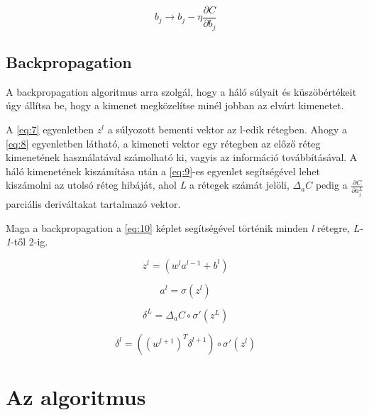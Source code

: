 \begin{equation} \label{eq:5}
\ b_{j} \rightarrow b_{j} - \eta\frac{\partial C}{\partial b_{j}} 
\end{equation}


\section{Backpropagation}\label{sec:INTRO:backprop}


A backpropagation algoritmus arra szolgál, hogy a háló súlyait és küszöbértékeit úgy állítsa be, hogy a kimenet megközelítse minél jobban az elvárt kimenetet.

A \ref{eq:7} egyenletben $z^l$ a súlyozott bementi vektor az l-edik rétegben. Ahogy a \ref{eq:8} egyenletben látható, a kimeneti vektor egy rétegben az előző réteg kimenetének használatával számolható ki, vagyis az információ továbbításával. A háló kimenetének kiszámítása után a \ref{eq:9}-es egyenlet segítségével lehet kiszámolni az utolsó réteg hibáját, ahol \textit{L} a rétegek számát jelöli, \textit{$\Delta_aC$} pedig a $\frac{\partial C}{\partial a_j^L}$ parciális deriváltakat tartalmazó vektor.


Maga a backpropagation a \ref{eq:10} képlet segítségével történik minden \textit{l} rétegre, \textit{L-1}-től 2-ig.

\begin{equation} \label{eq:7}
\ z^l = (w^la^{l-1} + b^l) 
\end{equation}

\begin{equation} \label{eq:8}
\ a^l = \sigma(z^l) 
\end{equation}

\begin{equation} \label{eq:9}
\ \delta^L = \Delta_a C \circ \sigma'(z^L)
\end{equation}

\begin{equation} \label{eq:10}
\ \delta^l = ((w^{l+1})^T \delta^{l+1}) \circ \sigma'(z^l)
\end{equation}

\chapter{Az algoritmus} \label{algorihm}

